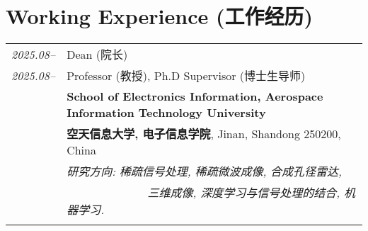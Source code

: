 \documentclass[paper=a4,fontsize=11pt]{scrartcl}
\begin{document}

\section*{Working Experience (工作经历)}

\begin{longtable}{r|p{12cm}}

\emph{2025.08--} & Dean (院长)\\	
\emph{2025.08--} & Professor (教授), Ph.D Supervisor (博士生导师)\\	
& \normalsize\textbf{School of Electronics Information, Aerospace Information Technology University}\\
& \normalsize\textbf{空天信息大学, 电子信息学院}, Jinan, Shandong 250200, China \\
& \emph{研究方向: 稀疏信号处理, 稀疏微波成像, 合成孔径雷达,}\\
& \emph{~~~~~~~~~~~~~~三维成像, 深度学习与信号处理的结合, 机器学习.} \\
\multicolumn{2}{c}{} \\


\end{longtable}
\end{document}
